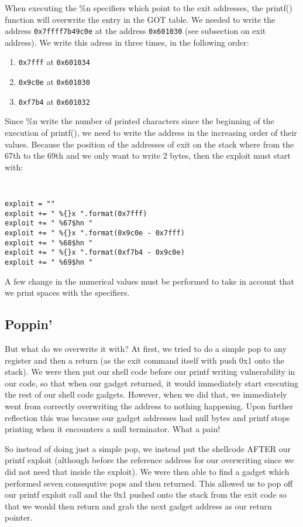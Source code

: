 When executing the \%n specifiers which point to the exit addresses, the printf() function will overwrite the entry in the GOT table. We needed to write the address {\tt 0x7ffff7b49c0e} at the address {\tt 0x601030} (see subsection on exit address). We write this adress in three times, in the following order:
\begin{enumerate}
\item {\tt 0x7fff} at {\tt 0x601034}
\item {\tt 0x9c0e} at {\tt 0x601030}
\item {\tt 0xf7b4} at {\tt 0x601032}
\end{enumerate}
Since \%n write the number of printed characters since the beginning of the execution of printf(), we need to write the address in the increasing order of their values. Because the position of the addresses of exit on the stack where from the 67th to the 69th and we only want to write 2 bytes, then the exploit must start with:

{\tt \small
\begin{verbatim}
exploit = ""
exploit += " %{}x ".format(0x7fff)
exploit += " %67$hn "
exploit += " %{}x ".format(0x9c0e - 0x7fff)
exploit += " %68$hn "
exploit += " %{}x ".format(0xf7b4 - 0x9c0e)
exploit += " %69$hn "
\end{verbatim}
}

A few change in the numerical values must be performed to take in account that we print spaces with the specifiers.

\subsection{Poppin'}
But what do we overwrite it with? At first, we tried to do a simple pop to any register and then a return (as the exit command itself with push 0x1 onto the stack). We were then put our shell code before our printf writing vulnerability in our code, so that when our gadget returned, it would immediately start executing the rest of our shell code gadgets. However, when we did that, we immediately went from correctly overwriting the address to nothing happening. Upon further reflection this was because our gadget addresses had null bytes and printf stops printing when it encounters a null terminator. What a pain! 

So instead of doing just a simple pop, we instead put the shellcode AFTER our printf exploit (although before the reference address for our overwriting since we did not need that inside the exploit). We were then able to find a gadget which performed seven consequtive pops and then returned. This allowed us to pop off our printf exploit call and the 0x1 pushed onto the stack from the exit code so that we would then return and grab the next gadget address as our return pointer. 

